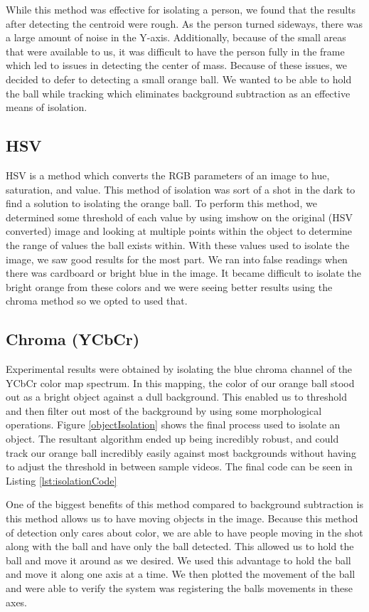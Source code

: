 \documentclass{IEEEtran}
\begin{document}
While this method was effective for isolating a person, we found that the results after detecting the centroid were rough. As the person turned sideways, there was a large amount of noise in the Y-axis. Additionally, because of the small areas that were available to us, it was difficult to have the person fully in the frame which led to issues in detecting the center of mass. Because of these issues, we decided to defer to detecting a small orange ball. We wanted to be able to hold the ball while tracking which eliminates background subtraction as an effective means of isolation.  

\subsection{HSV}
HSV is a method which converts the RGB parameters of an image to hue, saturation, and value. This method of isolation was sort of a shot in the dark to find a solution to isolating the orange ball. To perform this method, we determined some threshold of each value by using imshow on the original (HSV converted) image and looking at multiple points within the object to determine the range of values the ball exists within. With these values used to isolate the image, we saw good results for the most part. We ran into false readings when there was cardboard or bright blue in the image. It became difficult to isolate the bright orange from these colors and we were seeing better results using the chroma method so we opted to used that.

\subsection{Chroma (YCbCr)}
Experimental results were obtained by isolating the blue chroma channel of the YCbCr color map spectrum. In this mapping, the color of our orange ball stood out as a bright object against a dull background. This enabled us to threshold and then filter out most of the background by using some morphological operations. Figure \ref{objectIsolation} shows the final process used to isolate an object. The resultant algorithm ended up being incredibly robust, and could track our orange ball incredibly easily against most backgrounds without having to adjust the threshold in between sample videos. The final code can be seen in Listing \ref{lst:isolationCode}

One of the biggest benefits of this method compared to background subtraction is this method allows us to have moving objects in the image. Because this method of detection only cares about color, we are able to have people moving in the shot along with the ball and have only the ball detected. This allowed us to hold the ball and move it around as we desired. We used this advantage to hold the ball and move it along one axis at a time. We then plotted the movement of the ball and were able to verify the system was registering the balls movements in these axes.
\end{document}
